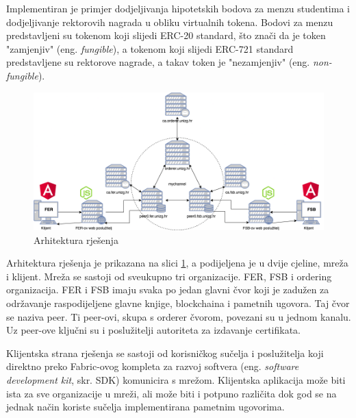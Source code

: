 \documentclass[times, utf8, diplomski]{fer}
\begin{document}
Implementiran je primjer dodjeljivanja hipotetskih bodova za menzu studentima i dodjeljivanje rektorovih nagrada u obliku virtualnih tokena. Bodovi za menzu predstavljeni su tokenom koji slijedi ERC-20 standard, što znači da je token "zamjenjiv" (eng. \textit{fungible}), a tokenom koji slijedi ERC-721 standard predstavljene su rektorove nagrade, a takav token je "nezamjenjiv" (eng. \textit{non-fungible}).

\begin{figure}[htb]
\centering
\includegraphics[scale=0.33]{imgs/Arhitektura.png}
\caption{Arhitektura rješenja}
\label{fig:arhitektura}
\end{figure}

Arhitektura rješenja je prikazana na slici \ref{fig:arhitektura},  a podijeljena je u dvije cjeline,  mreža i klijent. Mreža se sastoji od sveukupno tri organizacije. FER, FSB i ordering organizacija. FER i FSB imaju svaka po jedan glavni čvor koji je zadužen za održavanje raspodijeljene glavne knjige, blockchaina i pametnih ugovora. Taj čvor se naziva peer.  Ti peer-ovi, skupa s orderer čvorom, povezani su u jednom kanalu.  Uz peer-ove ključni su i poslužitelji autoriteta za izdavanje certifikata.

Klijentska strana rješenja se sastoji od korisničkog sučelja i poslužitelja koji direktno preko Fabric-ovog kompleta za razvoj softvera (eng. \textit{software development kit}, skr. SDK) komunicira s mrežom. Klijentska aplikacija može biti ista za sve organizacije u mreži, ali može biti i potpuno različita dok god se na jednak način koriste sučelja implementirana pametnim ugovorima. 
\end{document}
